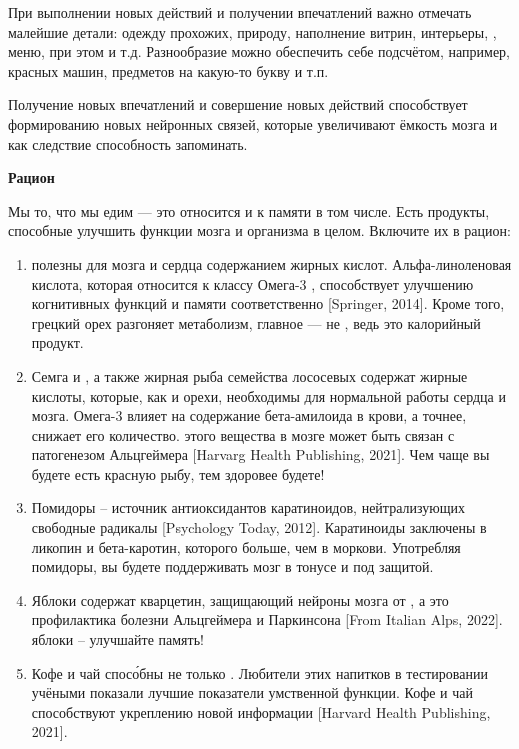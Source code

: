 При выполнении новых действий и получении впечатлений важно отмечать малейшие детали: одежду прохожих, природу, наполнение витрин, интерьеры, , меню,  при этом и т.д. Разнообразие можно обеспечить себе подсчётом, например, красных машин, предметов на какую-то букву и т.п.

Получение новых впечатлений и совершение новых действий способствует формированию новых нейронных связей, которые увеличивают ёмкость мозга и как следствие способность запоминать.

\textbf{Рацион}

Мы то, что мы едим --- это относится и к памяти в том числе. Есть продукты, способные улучшить функции мозга и организма в целом. Включите их в рацион:

\begin{enumerate}
    \item {} полезны для мозга и сердца содержанием жирных кислот. Альфа-линоленовая кислота, которая относится к классу Омега-3 , способствует улучшению когнитивных функций и памяти соответственно [Springer, 2014]. Кроме того, грецкий орех разгоняет метаболизм, главное --- не , ведь это калорийный продукт.
    \item Семга и , а также жирная рыба семейства лососевых содержат жирные кислоты, которые, как и орехи, необходимы для нормальной работы сердца и мозга. Омега-3 влияет на содержание бета-амилоида в крови, а точнее, снижает его количество.  этого вещества в мозге может быть связан с патогенезом Альцгеймера [Harvarg Health Publishing, 2021]. Чем чаще вы будете есть красную рыбу, тем здоровее будете!
    \item Помидоры – источник антиоксидантов каратиноидов, нейтрализующих свободные радикалы [Psychology Today, 2012]. Каратиноиды заключены в ликопин и бета-каротин, которого больше, чем в моркови. Употребляя помидоры, вы будете поддерживать мозг в тонусе и под защитой.
    \item Яблоки содержат кварцетин, защищающий нейроны мозга от , а это профилактика болезни Альцгеймера и Паркинсона [From Italian Alps, 2022].  яблоки – улучшайте память!
    \item Кофе и чай спос\'{о}бны не только . Любители этих напитков в тестировании учёными показали лучшие показатели умственной функции. Кофе и чай способствуют укреплению новой информации [Harvard Health Publishing, 2021].
\end{enumerate}

